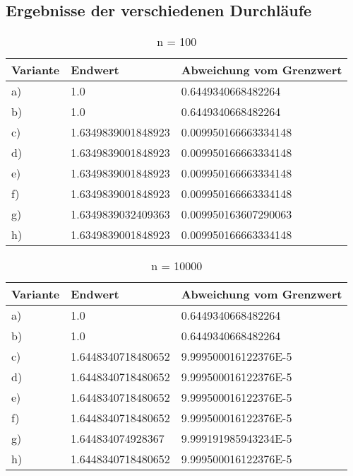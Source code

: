 \subsection{Ergebnisse der verschiedenen Durchläufe}
\begin{table}[ht] 
 \begin{tabular}{l | l | l} 
 
Variante & Endwert & Abweichung vom Grenzwert \\ 
 \hline 

a) &1.0&0.6449340668482264\\ 
b) &1.0&0.6449340668482264\\ 
c) &1.6349839001848923&0.009950166663334148\\ 
d) &1.6349839001848923&0.009950166663334148\\ 
e) &1.6349839001848923&0.009950166663334148\\ 
f) &1.6349839001848923&0.009950166663334148\\ 
g) &1.6349839032409363&0.009950163607290063\\ 
h) &1.6349839001848923&0.009950166663334148\\ 
\end{tabular} 
 \caption{n = 100} 
 \end{table}



\begin{table}[ht] 
 \begin{tabular}{l | l | l} 
 
Variante & Endwert & Abweichung vom Grenzwert \\ 
 \hline 

a) &1.0&0.6449340668482264\\ 
b) &1.0&0.6449340668482264\\ 
c) &1.6448340718480652&9.999500016122376E-5\\ 
d) &1.6448340718480652&9.999500016122376E-5\\ 
e) &1.6448340718480652&9.999500016122376E-5\\ 
f) &1.6448340718480652&9.999500016122376E-5\\ 
g) &1.644834074928367&9.999191985943234E-5\\ 
h) &1.6448340718480652&9.999500016122376E-5\\ 
\end{tabular} 
 \caption{n = 10000} 
 \end{table}



